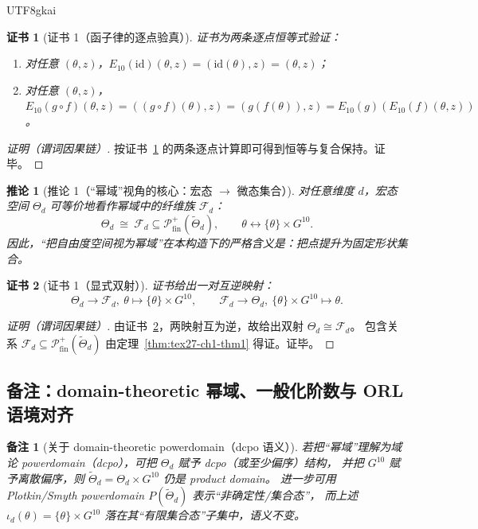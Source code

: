\documentclass[12pt]{article}
\newtheorem{corollary}{推论}[section]
\newtheorem{remark}{备注}[section]
\newtheorem{Certificate}{证书}[section]
\newcommand{\PP}{\mathcal{P}}
\begin{document}
\begin{CJK*}{UTF8}{gkai}
\begin{Certificate}[证书 1（函子律的逐点验真）]
\label{cert:tex27-ch1-prop1}
证书为两条逐点恒等式验证：
\begin{enumerate}
  \item 对任意 $(\theta,z)$，$E_{10}(\mathrm{id})(\theta,z)=(\mathrm{id}(\theta),z)=(\theta,z)$；
  \item 对任意 $(\theta,z)$，$E_{10}(g\circ f)(\theta,z)=((g\circ f)(\theta),z)=(g(f(\theta)),z)=E_{10}(g)(E_{10}(f)(\theta,
    z))$。
\end{enumerate}
\end{Certificate}

\begin{proof}[证明（谓词因果链）]
按证书~\ref{cert:tex27-ch1-prop1} 的两条逐点计算即可得到恒等与复合保持。证毕。
\end{proof}

\begin{corollary}[推论 1（“幂域”视角的核心：宏态 $\to$ 微态集合）]
\label{cor:tex27-ch1-cor1}
对任意维度 $d$，宏态空间 $\Theta_d$ 可等价地看作幂域中的纤维族 $\mathcal{F}_d$：
\[
  \Theta_d\ \cong\ \mathcal{F}_d\subseteq \PP_{\mathrm{fin}}^{+}(\widetilde{\Theta}_d),
  \qquad
  \theta\leftrightarrow \{\theta\}\times G^{10}.
\]
因此，“把自由度空间视为幂域”在本构造下的严格含义是：把点提升为固定形状集合。
\end{corollary}

\begin{Certificate}[证书 1（显式双射）]
\label{cert:tex27-ch1-cor1}
证书给出一对互逆映射：
\[
  \Theta_d\to\mathcal{F}_d,\ \theta\mapsto \{\theta\}\times G^{10},
  \qquad
  \mathcal{F}_d\to\Theta_d,\ \{\theta\}\times G^{10}\mapsto \theta.
\]
\end{Certificate}

\begin{proof}[证明（谓词因果链）]
由证书~\ref{cert:tex27-ch1-cor1}，两映射互为逆，故给出双射 $\Theta_d\cong \mathcal{F}_d$。
包含关系 $\mathcal{F}_d\subseteq \PP_{\mathrm{fin}}^{+}(\widetilde{\Theta}_d)$ 由定理~\ref{thm:tex27-ch1-thm1} 得证。证毕。
\end{proof}

\subsection{备注：domain-theoretic 幂域、一般化阶数与 ORL 语境对齐}
\label{subsec:tex27-ch1-remarks}

\begin{remark}[关于 domain-theoretic powerdomain（dcpo 语义）]
若把“幂域”理解为域论 power\allowbreak domain（dcpo），可把 $\Theta_d$ 赋予 dcpo（或至少偏序）结构，
并把 $G^{10}$ 赋予离散偏序，则 $\widetilde{\Theta}_d=\Theta_d\times G^{10}$ 仍是 product domain。
进一步可用 Plotkin/\allowbreak Smyth power\allowbreak domain $P(\widetilde{\Theta}_d)$ 表示“非确定性/集合态”\cite{PlotkinPowerdomain,
  SmythPowerdomain}，
而上述 $\iota_d(\theta)=\{\theta\}\times G^{10}$ 落在其“有限集合态”子集中，语义不变。
\end{remark}


\end{CJK*}
\end{document}
